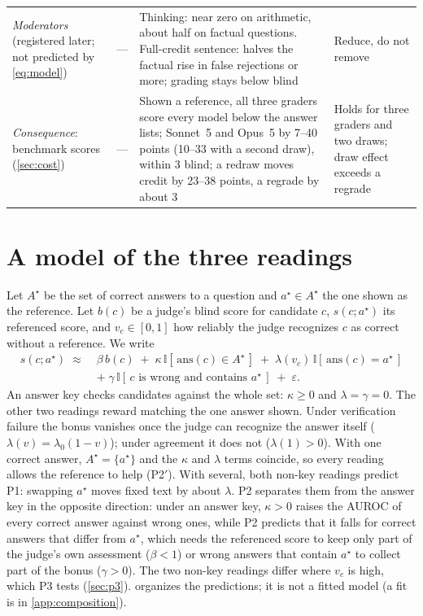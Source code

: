 \documentclass{article}
\begin{document}
\begin{table}[t]
\begin{tabular}{L{2.65cm}L{2.15cm}L{5.7cm}L{2.4cm}}
\addlinespace[2pt]
\emph{Moderators} (registered later; not predicted by \cref{eq:model}) & --- & Thinking: near zero on arithmetic, about half on factual questions. Full-credit sentence: halves the factual rise in false rejections or more; grading stays below blind & Reduce, do not remove \\
\addlinespace[2pt]
\emph{Consequence}: benchmark scores (\cref{sec:cost}) & --- & Shown a reference, all three graders score every model below the answer lists; Sonnet~5 and Opus~5 by 7--40 points (10--33 with a second draw), within 3 blind; a redraw moves credit by 23--38 points, a regrade by about 3 & Holds for three graders and two draws; draw effect exceeds a regrade \\
\bottomrule
\end{tabular}
\end{table}

\section{A model of the three readings}
\label{sec:model}

Let $A^\star$ be the set of correct answers to a question and $a^\star \in A^\star$ the one shown as the reference. Let $b(c)$ be a judge's blind score for candidate $c$, $s(c; a^\star)$ its referenced score, and $v_c \in [0, 1]$ how reliably the judge recognizes $c$ as correct without a reference. We write
\begin{equation}
\begin{aligned}
s(c; a^\star) \;\approx\;& \beta\, b(c) \;+\; \kappa\, \mathbb{I}[\,\mathrm{ans}(c) \in A^\star\,] \;+\; \lambda(v_c)\, \mathbb{I}[\,\mathrm{ans}(c) = a^\star\,] \\
&+\; \gamma\, \mathbb{I}[\,c \text{ is wrong and contains } a^\star\,] \;+\; \varepsilon .
\end{aligned}
\label{eq:model}
\end{equation}
An answer key checks candidates against the whole set: $\kappa \ge 0$ and $\lambda = \gamma = 0$. The other two readings reward matching the one answer shown. Under verification failure the bonus vanishes once the judge can recognize the answer itself ($\lambda(v) = \lambda_0(1-v)$); under agreement it does not ($\lambda(1) > 0$).
With one correct answer, $A^\star = \{a^\star\}$ and the $\kappa$ and $\lambda$ terms coincide, so every reading allows the reference to help (P2$'$).
With several, both non-key readings predict P1: swapping $a^\star$ moves fixed text by about $\lambda$. P2 separates them from the answer key in the opposite direction: under an answer key, $\kappa > 0$ raises the AUROC of every correct answer against wrong ones, while P2 predicts that it falls for correct answers that differ from $a^\star$, which needs the referenced score to keep only part of the judge's own assessment ($\beta < 1$) or wrong answers that contain $a^\star$ to collect part of the bonus ($\gamma > 0$).
The two non-key readings differ where $v_c$ is high, which P3 tests (\cref{sec:p3}).
 organizes the predictions; it is not a fitted model (a fit is in \cref{app:composition}).
\end{document}
